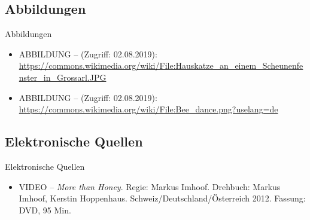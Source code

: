 %
%	
%
%	
%
%
%

\subsection*{Abbildungen}

\begin{frame}{Abbildungen}
	
	
	\begin{itemize}
		\item ABBILDUNG --  (Zugriff: 02.08.2019): \url{https://commons.wikimedia.org/wiki/File:Hauskatze\_an\_einem\_Scheunenfenster\_in\_Grossarl.JPG}
		\medskip
		\item ABBILDUNG --  (Zugriff: 02.08.2019):
		\url{https://commons.wikimedia.org/wiki/File:Bee\_dance.png?uselang=de}
	\end{itemize}	
	
\end{frame}


\subsection*{Elektronische Quellen}

\begin{frame}{Elektronische Quellen}
	
	
	
	\begin{itemize}
		\item VIDEO -- 	\textit{More than Honey}. Regie: Markus Imhoof. Drehbuch: Markus Imhoof, Kerstin Hoppenhaus. Schweiz/Deutschland/Österreich 2012. Fassung: DVD, 95 Min.
	\end{itemize}
	
\end{frame}

